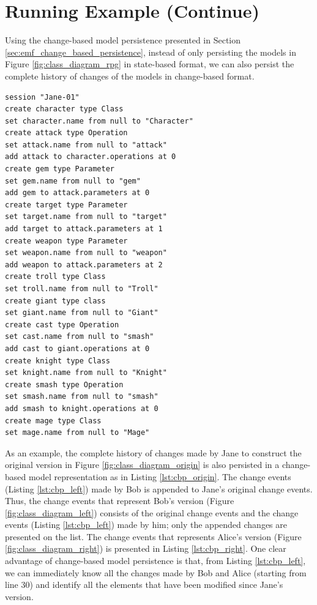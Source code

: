 \section{Running Example (Continue)}
\label{sec:runnnig_example_continue}
Using the change-based model persistence presented in Section \ref{sec:emf_change_based_persistence}, instead of only persisting the models in Figure \ref{fig:class_diagram_rpg} in state-based format, we can also persist the complete history of changes of the models in change-based format. 

\begin{lstlisting}[style=eol,caption={Change-based representation of the original version in Figure \ref{fig:class_diagram_origin}.},label=lst:cbp_origin]
session "Jane-01"
create character type Class
set character.name from null to "Character" 
create attack type Operation
set attack.name from null to "attack" 
add attack to character.operations at 0
create gem type Parameter
set gem.name from null to "gem" 
add gem to attack.parameters at 0
create target type Parameter
set target.name from null to "target" 
add target to attack.parameters at 1
create weapon type Parameter
set weapon.name from null to "weapon" 
add weapon to attack.parameters at 2
create troll type Class
set troll.name from null to "Troll" 
create giant type class
set giant.name from null to "Giant"
create cast type Operation
set cast.name from null to "smash"
add cast to giant.operations at 0
create knight type Class
set knight.name from null to "Knight"
create smash type Operation
set smash.name from null to "smash"
add smash to knight.operations at 0
create mage type Class
set mage.name from null to "Mage" 
\end{lstlisting}

As an example, the complete history of changes made by Jane to construct the original version in Figure \ref{fig:class_diagram_origin} is also persisted in a change-based model representation as in Listing \ref{lst:cbp_origin}. The change events (Listing \ref{lst:cbp_left}) made by Bob is appended to Jane's original change events. Thus, the change events that represent Bob's version (Figure \ref{fig:class_diagram_left}) consists of the original change events and the change events (Listing \ref{lst:cbp_left}) made by him; only the appended changes are presented on the list. The change events that represents Alice's version (Figure \ref{fig:class_diagram_right}) is presented in Listing \ref{lst:cbp_right}. One clear advantage of change-based model persistence is that, from Listing \ref{lst:cbp_left}, we can immediately know all the changes made by Bob and Alice (starting from line 30) and identify all the elements that have been modified since Jane's version.  

